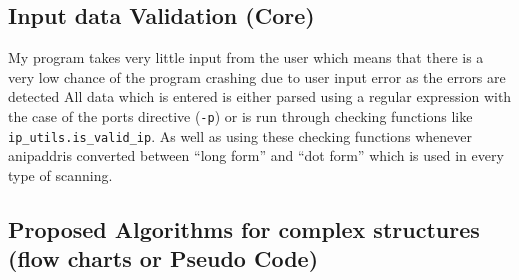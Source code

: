 \documentclass[titlepage]{article}
\let\Oldsubsection\subsection{}
\renewcommand{\subsection}{\FloatBarrier\Oldsubsection}
\begin{document}
\subsection{Input data Validation (Core)}

My program takes very little input from the user which means that there is a very low chance of the program
crashing due to user input error as the errors are detected
All data which is entered is either parsed using a regular expression with the case of the
\glspl{port} directive (\verb|-p|) or is run through checking functions like \verb|ip_utils.is_valid_ip|.
As well as using these checking functions whenever an\gls{ipaddr}is converted between ``long form''
and ``dot form'' which is used in every type of scanning.

\subsection{Proposed Algorithms for complex structures (flow charts or Pseudo Code)}

\begin{algorithm}
  \caption{%
  My algorithm for turning a \gls{cidr} specified \gls{subnet} into a list of actual \gls{ipaddr}es
}\label{ip_range}
  \begin{algorithmic}[1]
    \EndFor{}
    \EndFor{}
    \EndProcedure{}
  \end{algorithmic}
\end{algorithm}
\end{document}
